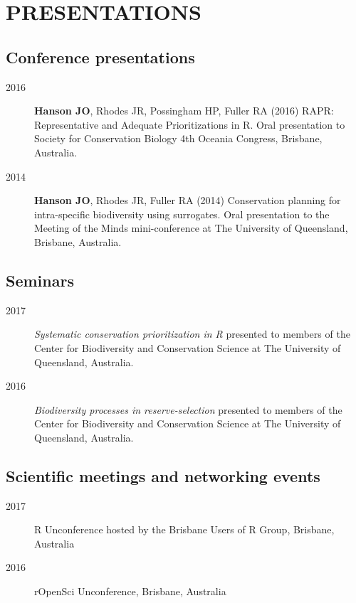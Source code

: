 \documentclass[12pt,a4paper]{article}
\begin{document}
\clearpage

\section*{PRESENTATIONS}
\subsection*{Conference presentations}
\begin{description}

\item[2016] \textbf{Hanson JO}, Rhodes JR, Possingham HP, Fuller RA (2016) RAPR: Representative and Adequate Prioritizations in R. Oral presentation to Society for Conservation Biology 4th Oceania Congress, Brisbane, Australia.

\item[2014] \textbf{Hanson JO}, Rhodes JR, Fuller RA (2014) Conservation planning for intra-specific biodiversity using surrogates. Oral presentation to the Meeting of the Minds mini-conference at The University of Queensland, Brisbane, Australia.

\end{description}

\subsection*{Seminars}
\begin{description}

\item[2017] \textit{Systematic conservation prioritization in R} presented to members of the Center for Biodiversity and Conservation Science at The University of Queensland, Australia.

\item[2016] \textit{Biodiversity processes in reserve-selection} presented to members of the Center for Biodiversity and Conservation Science at The University of Queensland, Australia.

\end{description}

\subsection*{Scientific meetings and networking events}
\begin{description}

\item[2017] R Unconference hosted by the Brisbane Users of R Group, Brisbane, Australia

\item[2016] rOpenSci Unconference, Brisbane, Australia

\end{description}
\end{document}
